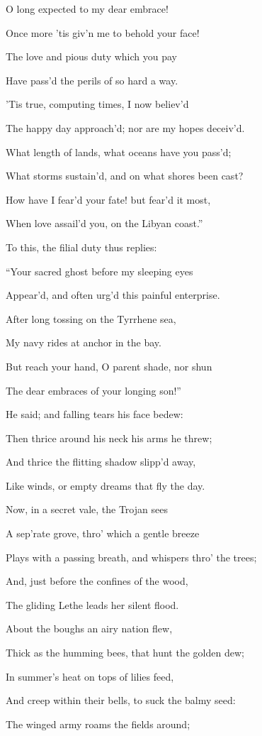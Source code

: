 O long expected to my dear embrace!

Once more ’tis giv’n me to behold your face!

The love and pious duty which you pay

Have pass’d the perils of so hard a way.

’Tis true, computing times, I now believ’d

The happy day approach’d; nor are my hopes deceiv’d.

What length of lands, what oceans have you pass’d;

What storms sustain’d, and on what shores been cast?

How have I fear’d your fate! but fear’d it most,

When love assail’d you, on the Libyan coast.”

To this, the filial duty thus replies:

“Your sacred ghost before my sleeping eyes

Appear’d, and often urg’d this painful enterprise.

After long tossing on the Tyrrhene sea,

My navy rides at anchor in the bay.

But reach your hand, O parent shade, nor shun

The dear embraces of your longing son!”

He said; and falling tears his face bedew:

Then thrice around his neck his arms he threw;

And thrice the flitting shadow slipp’d away,

Like winds, or empty dreams that fly the day.

Now, in a secret vale, the Trojan sees

A sep’rate grove, thro’ which a gentle breeze

Plays with a passing breath, and whispers thro’ the trees;

And, just before the confines of the wood,

The gliding Lethe leads her silent flood.

About the boughs an airy nation flew,

Thick as the humming bees, that hunt the golden dew;

In summer’s heat on tops of lilies feed,

And creep within their bells, to suck the balmy seed:

The winged army roams the fields around;

